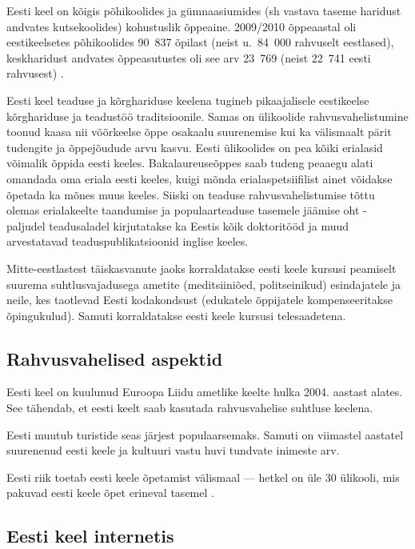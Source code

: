 \begin{multicols}{2}
Eesti keel on kõigis põhikoolides ja gümnaasiumides (sh vastava taseme haridust andvates kutsekoolides) kohustuslik õppeaine. 
2009/2010 õppeaastal oli eestikeelsetes põhikoolides 90~837 õpilast
(neist u.~84~000 rahvuselt eestlased), keskharidust andvates
õppeasutustes oli see arv 23~769 (neist 22~741 eesti rahvusest)
\cite{DevPlan}. 


Eesti keel teaduse ja kõrghariduse keelena tugineb pikaajalisele eestikeelse kõrghariduse ja teadustöö traditsioonile. 
Samas on ülikoolide rahvusvahelistumine toonud kaasa nii võõrkeelse õppe osakaalu suurenemise kui ka välismaalt pärit tudengite ja õppejõudude arvu kasvu. 
Eesti ülikoolides on pea kõiki erialasid võimalik õppida eesti keeles. 
Bakalaureuseõppes saab tudeng peaaegu alati omandada oma eriala eesti keeles, kuigi mõnda erialaspetsiifilist ainet võidakse õpetada ka mõnes muus keeles.
Siiski on teaduse rahvusvahelistumise tõttu olemas erialakeelte taandumise ja populaarteaduse tasemele jäämise oht - paljudel teadusaladel kirjutatakse ka Eestis kõik doktoritööd ja muud arvestatavad teaduspublikatsioonid inglise keeles.
   
Mitte-eestlastest täiskasvanute jaoks kor\-ral\-datakse eesti keele kursusi peamiselt suu\-rema suhtlusvajadusega ametite (medit\-siini\-õed, politseinikud) esindajatele ja neile, kes taotlevad Eesti kodakondsust (edukatele õppijatele kompenseeritakse õpingukulud). 
Samuti korraldatakse eesti keele kursusi telesaadetena.
 
\subsection{Rahvusvahelised aspektid}

Eesti keel on kuulunud Euroopa Liidu ametlike keelte hulka 2004. aastast alates. 
See tähendab, et eesti keelt saab kasutada rahvusvahelise suhtluse keelena.

Eesti muutub turistide seas järjest populaarsemaks. 
Samuti on viimastel aastatel suurenenud eesti keele ja kultuuri vastu huvi tundvate inimeste arv.

Eesti riik toetab eesti keele õpetamist välismaal --- hetkel on üle 30 ülikooli, mis pakuvad eesti keele õpet erineval tasemel \cite{EstInst}.

\subsection{Eesti keel internetis}


\end{multicols}
